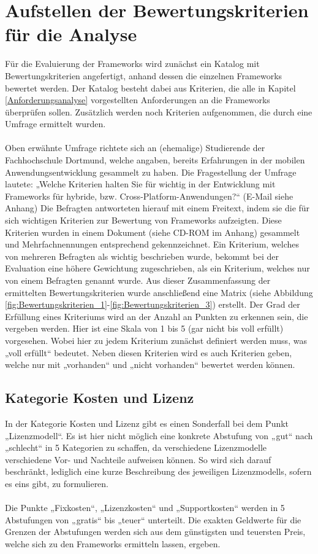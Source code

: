 \chapter{Aufstellen der Bewertungskriterien für die Analyse} \label{Bewertungskriterien}

Für die Evaluierung der Frameworks wird zunächst ein Katalog mit Bewertungskriterien angefertigt, anhand dessen die einzelnen Frameworks bewertet werden. Der Katalog besteht dabei aus Kriterien, die alle in Kapitel \ref{Anforderungsanalyse} vorgestellten Anforderungen an die Frameworks überprüfen sollen. Zusätzlich werden noch Kriterien aufgenommen, die durch eine Umfrage ermittelt wurden. 
\\
\\
Oben erwähnte Umfrage richtete sich an (ehemalige) Studierende der Fachhochschule Dortmund, welche angaben, bereits Erfahrungen in der mobilen Anwendungsentwicklung gesammelt zu haben. Die Fragestellung der Umfrage lautete: „Welche Kriterien halten Sie für wichtig in der Entwicklung mit Frameworks für hybride, bzw. Cross-Platform-Anwendungen?“ (E-Mail siehe Anhang) Die Befragten antworteten hierauf mit einem Freitext, indem sie die für sich wichtigen Kriterien zur Bewertung von Frameworks aufzeigten. Diese Kriterien wurden in einem Dokument (siehe CD-ROM im Anhang) gesammelt und Mehrfachnennungen entsprechend gekennzeichnet. Ein Kriterium, welches von mehreren Befragten als wichtig beschrieben wurde, bekommt bei der Evaluation eine höhere Gewichtung zugeschrieben, als ein Kriterium, welches nur von einem Befragten genannt wurde. Aus dieser Zusammenfassung der ermittelten Bewertungskriterien wurde anschließend eine Matrix (siehe Abbildung \ref{fig:Bewertungskriterien_1}-\ref{fig:Bewertungskriterien_3}) erstellt. Der Grad der Erfüllung eines Kriteriums wird an der Anzahl an Punkten zu erkennen sein, die vergeben werden. Hier ist eine Skala von 1 bis 5 (gar nicht bis voll erfüllt) vorgesehen. Wobei hier zu jedem Kriterium zunächst definiert werden muss, was „voll erfüllt“ bedeutet. Neben diesen Kriterien wird es auch Kriterien geben, welche nur mit „vorhanden“ und „nicht vorhanden“ bewertet werden können.

\section{Kategorie Kosten und Lizenz} 

In der Kategorie Kosten und Lizenz gibt es einen Sonderfall bei dem Punkt „Lizenzmodell“. Es ist hier nicht möglich eine konkrete Abstufung von „gut“ nach „schlecht“ in 5 Kategorien zu schaffen, da verschiedene Lizenzmodelle verschiedene Vor- und Nachteile aufweisen können. So wird sich darauf beschränkt, lediglich eine kurze Beschreibung des jeweiligen Lizenzmodells, sofern es eins gibt, zu formulieren. 
\\
\\
Die Punkte „Fixkosten“, „Lizenzkosten“ und „Supportkosten“ werden in 5 Abstufungen von „gratis“ bis „teuer“ unterteilt. Die exakten Geldwerte für die Grenzen der Abstufungen werden sich aus dem günstigsten und teuersten Preis, welche sich zu den Frameworks ermitteln lassen, ergeben.

